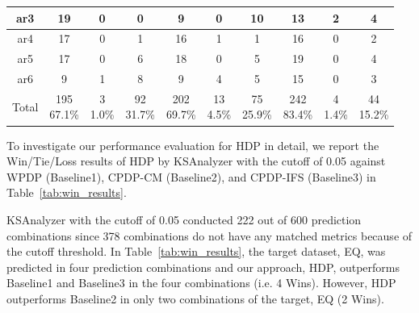 \begin{table}[!t]
\begin{tabular}{|@{}c@{}||@{}c@{}|@{}c@{}|@{}c@{}||@{}c@{}|@{}c@{}|@{}c@{}||@{}c@{}|@{}c@{}|@{}c@{}|}
ar3	&19	&0 	&0	&9	&0 	&10	&13	&2 	&4\\ \hline
ar4	&17	&0 	&1	&16	&1 	&1	&16	&0 	&2\\ \hline
ar5	&17	&0 	&6	&18	&0 	&5	&19	&0 	&4\\ \hline
ar6	&9	&1 	&8	&9	&4 	&5	&15	&0 	&3\\ \hline
\hline
Total	&\specialcell{{195}\\{67.1\%}}	&\specialcell{{3}\\{1.0\%}} 	&\specialcell{{92}\\{31.7\%}}	
		&\specialcell{{202}\\{69.7\%}}	&\specialcell{{13}\\{4.5\%}} 	&\specialcell{{75}\\{25.9\%}}	
		&\specialcell{{242}\\{83.4\%}}	&\specialcell{{4}\\{1.4\%}} 	&\specialcell{{44}\\{15.2\%}}\\ \hline

\end{tabular}
\end{table}


To investigate our performance evaluation for HDP in detail, we report
the Win/Tie/Loss results of HDP by KSAnalyzer with the cutoff of 0.05 against
WPDP (Baseline1), CPDP-CM (Baseline2), and CPDP-IFS
(Baseline3) in Table~\ref{tab:win_results}.


KSAnalyzer with the cutoff of 0.05 conducted 222 out of 600 prediction
combinations since 378 combinations do not have any matched
metrics because of the cutoff threshold. In
Table~\ref{tab:win_results}, the target dataset, EQ, was predicted in four
prediction combinations and our approach, HDP, outperforms Baseline1 and
Baseline3 in the four combinations (i.e. 4 Wins). However, HDP outperforms
Baseline2 in only two combinations of the target, EQ (2 Wins). 


